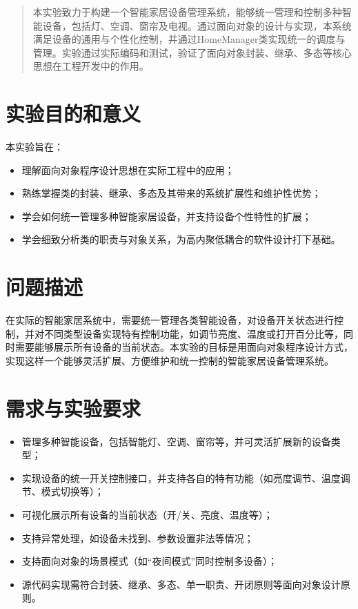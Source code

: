 \documentclass[12pt,hyperref,a4paper,UTF8]{ctexart}
\begin{document}
\cover

\begin{abstract}
本实验致力于构建一个智能家居设备管理系统，能够统一管理和控制多种智能设备，包括灯、空调、窗帘及电视。通过面向对象的设计与实现，本系统满足设备的通用与个性化控制，并通过HomeManager类实现统一的调度与管理。实验通过实际编码和测试，验证了面向对象封装、继承、多态等核心思想在工程开发中的作用。
\end{abstract}

\thispagestyle{empty} %

\newpage
\tableofcontents

\newpage

\section{实验目的和意义}
本实验旨在：
\begin{itemize}
    \item 理解面向对象程序设计思想在实际工程中的应用；
    \item 熟练掌握类的封装、继承、多态及其带来的系统扩展性和维护性优势；
    \item 学会如何统一管理多种智能家居设备，并支持设备个性特性的扩展；
    \item 学会细致分析类的职责与对象关系，为高内聚低耦合的软件设计打下基础。
\end{itemize}

\section{问题描述}
    在实际的智能家居系统中，需要统一管理各类智能设备，对设备开关状态进行控制，并对不同类型设备实现特有控制功能，如调节亮度、温度或打开百分比等，同时需要能够展示所有设备的当前状态。本实验的目标是用面向对象程序设计方式，实现这样一个能够灵活扩展、方便维护和统一控制的智能家居设备管理系统。

\section{需求与实验要求}
\begin{itemize}
    \item 管理多种智能设备，包括智能灯、空调、窗帘等，并可灵活扩展新的设备类型；
    \item 实现设备的统一开关控制接口，并支持各自的特有功能（如亮度调节、温度调节、模式切换等）；
    \item 可视化展示所有设备的当前状态（开/关、亮度、温度等）；
    \item 支持异常处理，如设备未找到、参数设置非法等情况；
    \item 支持面向对象的场景模式（如“夜间模式”同时控制多设备）；
    \item 源代码实现需符合封装、继承、多态、单一职责、开闭原则等面向对象设计原则。
\end{itemize}
\end{document}
